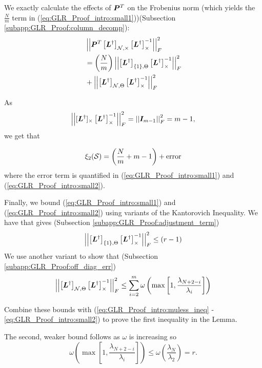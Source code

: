 We exactly calculate the effects of $\bm{P}^{T}$ on the Frobenius norm (which yields the $\frac{N}{m}$ term in (\ref{eq:GLR_Proof_intro:small1}))(Subsection \ref{subapp:GLR_Proof:column_decomp}):
\begin{align}
    &\sqfrob{\matr{P}^{T}\msub[N,\Theta]{\matr{L}^{\dagger}}\msub[\Theta]{\matr{L}^{\dagger}}^{-1}} \\
    &= \left(\frac{N}{m} \right) \sqfrob{\msubgen[\{1\},\Theta]{\matr{L}^{\dagger}}\msub[\Theta]{\matr{L}^{\dagger}}^{-1}} \label{eq:GLR_Proof_intro:small1}\\
    &+ \sqfrob{\msubgen[\set{N},\Theta]{\matr{L}^{\dagger}}\msub[\Theta]{\matr{L}^{\dagger}}^{-1}} \label{eq:GLR_Proof_intro:small2}
\end{align}

As 
\begin{equation}
\sqfrob{\matrsubpow[\Theta]{L}{\dagger}\msub[\Theta]{\matr{L}^{\dagger}}^{-1}} = \sqfrob{\matr{I}_{m-1}} = m-1,
\end{equation} we get that

\begin{equation}
    \xi_{2}(\mathcal{S}) = \left(\frac{N}{m} + m - 1\right) + \textrm{error}
\end{equation}
where the error term is quantified in (\ref{eq:GLR_Proof_intro:small1}) and (\ref{eq:GLR_Proof_intro:small2}).

Finally, we bound (\ref{eq:GLR_Proof_intro:small1}) and (\ref{eq:GLR_Proof_intro:small2}) using variants of the Kantorovich Inequality. We have that \cite[Eq. 20-23]{householder1965kantorovich} gives (Subsection \ref{subapp:GLR_Proof:adjustment_term})
\begin{equation}
    \sqfrob{\msubgen[\{1\},\Theta]{\matr{L}^{\dagger}}\msub[\Theta]{\matr{L}^{\dagger}}^{-1}} \leq (r-1)
\end{equation}
We use another variant to show that (Subsection  \ref{subapp:GLR_Proof:off_diag_err})
\begin{equation}
    \sqfrob{\msubgen[\set{N},\Theta]{\matr{L}^{\dagger}}\msub[\Theta]{\matr{L}^{\dagger}}^{-1}} \leq \sum^{m}_{i=2}\omega \left( \max\left[1,\frac{\lambda_{N+2-i}}{\lambda_{i}}\right] \right)
\end{equation}

Combine these bounds with (\ref{eq:GLR_Proof_intro:muless_ineq} - \ref{eq:GLR_Proof_intro:small2}) to prove the first inequality in the Lemma.

The second, weaker bound follows as $\omega$ is increasing so 
\begin{equation}
    \omega \left( \max\left[1,\frac{\lambda_{N+2-i}}{\lambda_{i}}\right] \right) \leq \omega\left(\frac{\lambda_{N}}{\lambda_{2}}\right) =r.
\end{equation}

